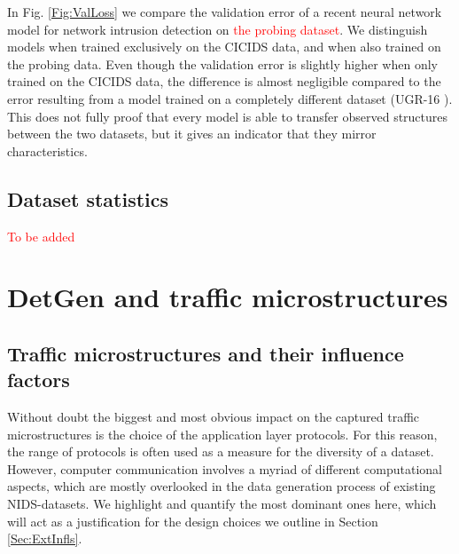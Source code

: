 \documentclass[runningheads]{llncs}
\begin{document}
In Fig. \ref{Fig:ValLoss} we compare the validation error of a recent neural network model for network intrusion detection \cite{henryLSTM} on \textcolor{red}{the probing dataset}. We distinguish models when trained exclusively on the CICIDS data, and when also trained on the probing data. Even though the validation error is slightly higher when only trained on the CICIDS data, the difference is almost negligible compared to the error resulting from a model trained on a completely different dataset (UGR-16 \cite{macia2018ugr}). This does not fully proof that every model is able to transfer observed structures between the two datasets, but it gives an indicator that they mirror characteristics.

\subsection{Dataset statistics}

\textcolor{red}{To be added}

\section{DetGen and traffic microstructures}\label{Sec:DetGenMicro}



\subsection{Traffic microstructures and their influence factors}

Without doubt the biggest and most obvious impact on the captured traffic microstructures is the choice of the application layer protocols. For this reason, the range of protocols is often used as a measure for the diversity of a dataset. However, computer communication involves a myriad of different computational aspects, which are mostly overlooked in the data generation process of existing NIDS-datasets. We highlight and quantify the most dominant ones here, which will act as a justification for the design choices we outline in Section \ref{Sec:ExtInfls}.

\end{document}
